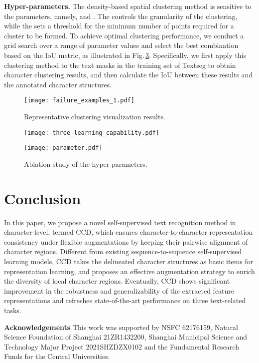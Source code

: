 \documentclass[10pt,twocolumn,letterpaper]{article}
\begin{document}
\noindent \textbf{Hyper-parameters.} \label{Hyper-parameter}
The density-based spatial clustering method is sensitive to the parameters, namely,  and . The  controls the granularity of the clustering, while the  sets a threshold for the minimum number of points required for a cluster to be formed.
To achieve optimal clustering performance, we conduct a grid search over a range of parameter values and select the best combination based on the IoU metric, as illustrated in Fig.\,\ref{Figs.parameter}. Specifically, we first apply this clustering method to the text masks in the training set of Textseg to obtain character clustering results, and then calculate the IoU between these results and the annotated character structures.

\begin{figure}[t]
\centering
\graphicspath{{./graph/}}
\texttt{[image: failure\_examples\_1.pdf]}
\caption{Representative clustering visualization results.}
\label{Figs.failure_examples}
\end{figure}

\begin{figure}[t]
  \centering
  \graphicspath{{./graph/}}
  \texttt{[image: three\_learning\_capability.pdf]}
  \caption{}
  \label{Figs.three_learning_capability}
\end{figure}

\begin{figure}[t]
  \centering
  \graphicspath{{./graph/}}
  \texttt{[image: parameter.pdf]}
  \caption{Ablation study of the hyper-parameters.}
  \label{Figs.parameter}
\end{figure}

\section{Conclusion}
In this paper, we propose a novel self-supervised text recognition method in character-level, termed CCD, which ensures character-to-character representation consistency under flexible augmentations by keeping their pairwise alignment of character regions.
Different from existing sequence-to-sequence self-supervised learning models, CCD takes the delineated character structures as basic items for representation learning, and proposes an effective augmentation strategy to enrich the diversity of local character regions. Eventually, CCD shows significant improvement in the robustness and generalizability of the extracted feature representations and refreshes state-of-the-art performance on three text-related tasks. 

\noindent \textbf{Acknowledgements} This work was supported by NSFC 62176159, Natural Science Foundation of Shanghai 21ZR1432200, Shanghai Municipal Science and Technology Major Project 2021SHZDZX0102 and the Fundamental Research Funds for the Central Universities.

\newpage
{\small


}
\end{document}
